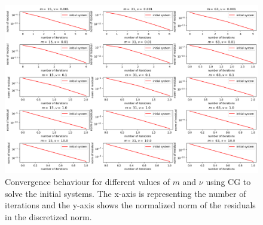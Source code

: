 \documentclass{amsart}
\theoremstyle{definition}
\theoremstyle{remark}
\numberwithin{equation}{section}
\begin{document}
\begin{figure}[h!]
\centering
\includegraphics[scale=0.52]{./imgs/CG_analysis_initial}
\caption{Convergence behaviour for different values of $m$ and $\nu$ using CG to solve the initial systems.
The x-axis is representing the number of iterations and the y-axis shows the normalized norm of the residuals in the discretized norm.}
\label{fig:CG-convergence-initial}
\end{figure}

\end{document}
